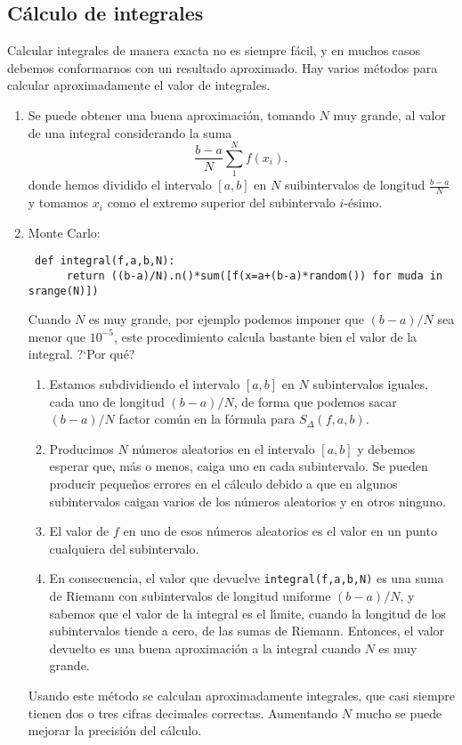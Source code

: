 \subsection{ C\'alculo de integrales}

Calcular integrales de manera exacta no es siempre f\'acil, y en muchos casos
debemos conformarnos con un resultado aproximado. Hay varios m\'etodos para
calcular aproximadamente el valor de integrales.

\begin{enumerate}

\item Se puede obtener una buena aproximaci\'on, tomando $N$ muy grande,  al
valor de una integral considerando la suma
\[\frac{b-a}{N}\sum_{1}^{N} f(x_i),\]
\noindent donde hemos dividido el intervalo $[a,b]$ en $N$ suibintervalos de
longitud $\frac{b-a}{N}$ y tomamos $x_i$ como el extremo superior del
subintervalo $i$-\'esimo. 

\item {\sc Monte Carlo:}
\begin{lstlisting}
 def integral(f,a,b,N):
      return ((b-a)/N).n()*sum([f(x=a+(b-a)*random()) for muda in srange(N)])
\end{lstlisting}

Cuando $N$ es muy grande, por ejemplo podemos imponer que $(b-a)/N$ sea menor
que $10^{-5}$, este procedimiento calcula bastante bien el valor de la
integral. 
?`Por qu\'e? 
\begin{enumerate}
\item Estamos subdividiendo el intervalo $[a,b]$ en $N$ subintervalos iguales,
cada uno de longitud $(b-a)/N$, de forma que podemos sacar $(b-a)/N$ factor
com\'un en la f\'ormula para $S_{\Delta}(f,a,b)$.
\item Producimos $N$ n\'umeros aleatorios en el intervalo $[a,b]$ y debemos
esperar que, m\'as o menos, caiga uno en cada subintervalo. Se pueden producir
peque\~nos errores en el c\'alculo debido a que en algunos subintervalos caigan
varios de los n\'umeros aleatorios y en otros ninguno.
\item El valor de $f$ en uno de esos n\'umeros aleatorios es el valor en un 
punto cualquiera del subintervalo.
\item En consecuencia, el valor que devuelve \lstinline|integral(f,a,b,N)| es 
una suma  de Riemann con subintervalos de longitud uniforme $(b-a)/N$, y 
sabemos que el valor de la integral es el l\'{\i}mite, cuando la longitud de 
los subintervalos tiende a cero, de las sumas de Riemann. Entonces, el valor 
devuelto es una buena aproximaci\'on a la integral cuando $N$ es muy grande. 
\end{enumerate}
Usando este m\'etodo se calculan aproximadamente integrales,  que casi siempre
tienen dos o tres cifras decimales correctas.  Aumentando $N$ mucho se puede
mejorar la precisi\'on del c\'alculo. 


\end{enumerate}
